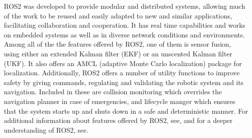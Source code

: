 
ROS2 was developed to provide modular and distributed systems, allowing much of the work to be reused and easily adapted to new and similar applications, facilitating collaboration and cooperation\:\cite{macenski_robot_2022}. It has real time capabilities and works on embedded systems as well as in diverse network conditions and environments\:\cite{macenski_robot_2022}.
Among all of the the features offered by ROS2, one of them is sensor fusion, using either an extended Kalman filter (EKF) or an unscented Kalman filter (UKF)\:\cite{macenski_desks_2023}. 
It also offers an AMCL (adaptive Monte Carlo localization) package for localization\:\cite{macenski_desks_2023}. 
Additionally, ROS2 offers a number of utility functions to improve safety by giving commands, regulating and validating the robotic system and its navigation\:\cite{macenski_desks_2023}. Included in these are collision monitoring which overrides the navigation planner in case of emergencies, and lifecycle manger which ensures that the system starts up and shuts down in a safe and deterministic manner\:\cite{macenski_desks_2023}. 
For additional information about features offered by ROS2, see\:\cite{macenski_desks_2023}, and for a deeper understanding of ROS2, see\:\cite{macenski_robot_2022}.



\begin{comment}
    
\end{comment}
